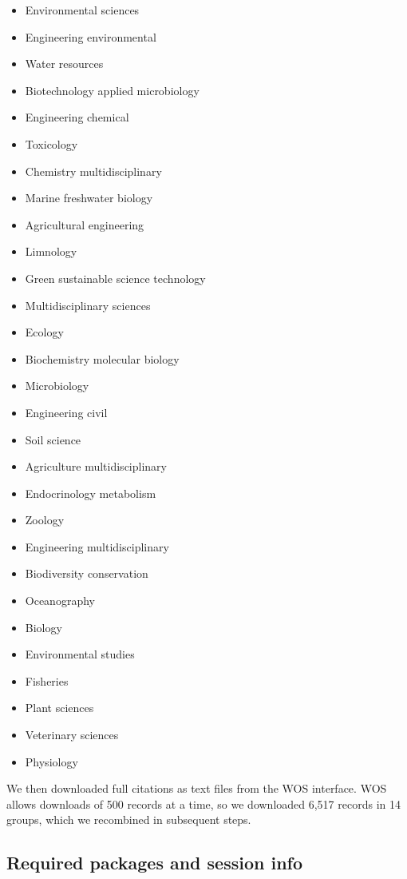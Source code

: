 \documentclass[
]{article}
\providecommand{\tightlist}{%
  \setlength{\itemsep}{0pt}\setlength{\parskip}{0pt}}
\begin{document}
\begin{itemize}
\tightlist
\item
  Environmental sciences
\item
  Engineering environmental
\item
  Water resources
\item
  Biotechnology applied microbiology
\item
  Engineering chemical
\item
  Toxicology
\item
  Chemistry multidisciplinary
\item
  Marine freshwater biology
\item
  Agricultural engineering
\item
  Limnology
\item
  Green sustainable science technology
\item
  Multidisciplinary sciences
\item
  Ecology
\item
  Biochemistry molecular biology
\item
  Microbiology
\item
  Engineering civil
\item
  Soil science
\item
  Agriculture multidisciplinary
\item
  Endocrinology metabolism
\item
  Zoology
\item
  Engineering multidisciplinary
\item
  Biodiversity conservation
\item
  Oceanography
\item
  Biology
\item
  Environmental studies
\item
  Fisheries
\item
  Plant sciences
\item
  Veterinary sciences
\item
  Physiology
\end{itemize}

We then downloaded full citations as text files from the WOS interface.
WOS allows downloads of 500 records at a time, so we downloaded 6,517
records in 14 groups, which we recombined in subsequent steps.

\hypertarget{required-packages-and-session-info}{%
\subsection{Required packages and session
info}\label{required-packages-and-session-info}}
\end{document}
